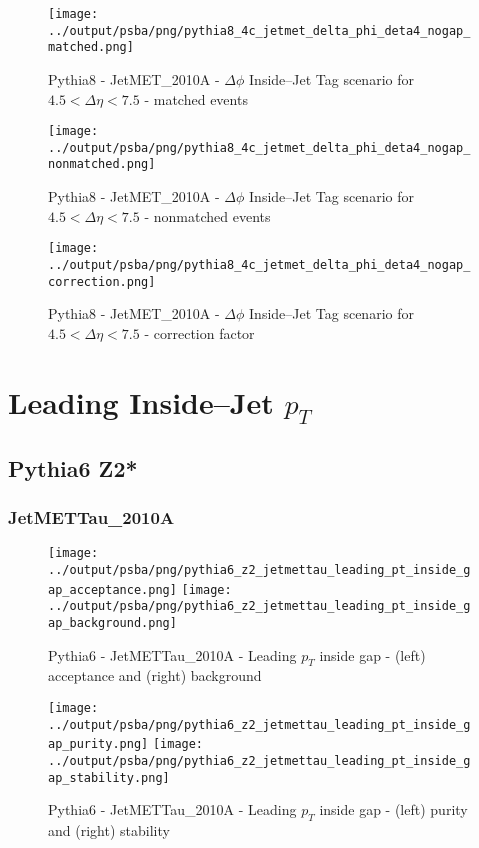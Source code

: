 \documentclass[11pt]{book}
\begin{document}
\begin{figure}[ht]
\centering
\texttt{[image: ../output/psba/png/pythia8\_4c\_jetmet\_delta\_phi\_deta4\_nogap\_matched.png]}
\caption{Pythia8 - JetMET\_2010A - $\Delta\phi$ Inside--Jet Tag scenario for $4.5 < \Delta\eta < 7.5$ - matched events}
\label{fig:p8_jetmet_delta_phi_deta4_nogap_matched}
\end{figure}

\begin{figure}[ht]
\centering
\texttt{[image: ../output/psba/png/pythia8\_4c\_jetmet\_delta\_phi\_deta4\_nogap\_nonmatched.png]}
\caption{Pythia8 - JetMET\_2010A - $\Delta\phi$ Inside--Jet Tag scenario for $4.5 < \Delta\eta < 7.5$ - nonmatched events}
\label{fig:p8_jetmet_delta_phi_deta4_nogap_nonmatched}
\end{figure}

\begin{figure}[ht]
\centering
\texttt{[image: ../output/psba/png/pythia8\_4c\_jetmet\_delta\_phi\_deta4\_nogap\_correction.png]}
\caption{Pythia8 - JetMET\_2010A - $\Delta\phi$ Inside--Jet Tag scenario for $4.5 < \Delta\eta < 7.5$ - correction factor}
\label{fig:p8_jetmet_delta_phi_deta4_nogap_correction}
\end{figure}


\clearpage
\chapter{Leading Inside--Jet $p_{T}$}
\section{Pythia6 Z2*}
\subsection{JetMETTau\_2010A}

\begin{figure}[ht]
\centering
\texttt{[image: ../output/psba/png/pythia6\_z2\_jetmettau\_leading\_pt\_inside\_gap\_acceptance.png]}
\texttt{[image: ../output/psba/png/pythia6\_z2\_jetmettau\_leading\_pt\_inside\_gap\_background.png]}
\caption{Pythia6 - JetMETTau\_2010A - Leading $p_{T}$ inside gap - (left) acceptance and (right) background}
\label{fig:p6_jetmettau_leading_pt_inside_gap_ab}
\end{figure}

\begin{figure}[ht]
\centering
\texttt{[image: ../output/psba/png/pythia6\_z2\_jetmettau\_leading\_pt\_inside\_gap\_purity.png]}
\texttt{[image: ../output/psba/png/pythia6\_z2\_jetmettau\_leading\_pt\_inside\_gap\_stability.png]}
\caption{Pythia6 - JetMETTau\_2010A - Leading $p_{T}$ inside gap - (left) purity and (right) stability}
\label{fig:p6_jetmettau_leading_pt_inside_gap_ps}
\end{figure}
\end{document}
